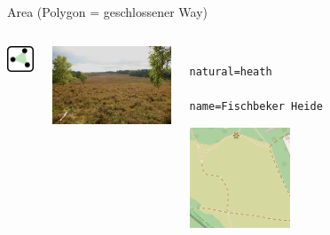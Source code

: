 \documentclass{beamer}
\begin{document}
			\begin{frame}[fragile]{Area (Polygon = geschlossener Way)}
				\begin{center}
					\begin{columns}
						\begin{column}{1cm}
							\centering
							\includegraphics[width=1cm]{images/240px-Mf_area.png}
						\end{column}
						\begin{column}{4.5cm}
							\includegraphics[width=4.5cm]{images/area-example.jpg}
						\end{column}
						\begin{column}{4cm}
							\begin{verbatim}
								natural=heath
								name=Fischbeker Heide
							\end{verbatim}
							\begin{center}
								\includegraphics[height=3cm]{images/heath.png}
							\end{center}
						\end{column}
					\end{columns}
				\end{center}
			\end{frame}
	
\end{document}
